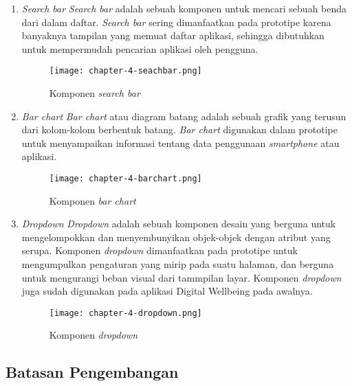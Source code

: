 \begin{enumerate}
  \item \textit{Search bar}
  \subitem \textit{Search bar} adalah sebuah komponen untuk mencari sebuah benda dari dalam daftar. \textit{Search bar} sering dimanfaatkan pada prototipe karena banyaknya tampilan yang memuat daftar aplikasi, sehingga dibutuhkan untuk mempermudah pencarian aplikasi oleh pengguna.
 
  \begin{figure}[h]
    \centering
    \texttt{[image: chapter-4-seachbar.png]}
    \caption{Komponen \textit{search bar}}
    \label{img:searchbar}
  \end{figure}
  \FloatBarrier

  \item \textit{Bar chart}
  \subitem \textit{Bar chart} atau diagram batang adalah sebuah grafik yang terusun dari kolom-kolom berbentuk batang. \textit{Bar chart} digunakan dalam prototipe untuk menyampaikan informasi tentang data penggunaan \textit{smartphone} atau aplikasi.
 
  \begin{figure}[h]
    \centering
    \texttt{[image: chapter-4-barchart.png]}
    \caption{Komponen \textit{bar chart}}
    \label{img:barchart}
  \end{figure}
  \FloatBarrier

  \item \textit{Dropdown}
  \subitem \textit{Dropdown} adalah sebuah komponen desain yang berguna untuk mengelompokkan dan menyembunyikan objek-objek dengan atribut yang serupa. Komponen \textit{dropdown} dimanfaatkan pada prototipe untuk mengumpulkan pengaturan yang mirip pada suatu halaman, dan berguna untuk mengurangi beban visual dari tammpilan layar. Komponen \textit{dropdown} juga sudah digunakan pada aplikasi Digital Wellbeing pada awalnya.
 
  \begin{figure}[h]
    \centering
    \texttt{[image: chapter-4-dropdown.png]}
    \caption{Komponen \textit{dropdown}}
    \label{img:dropdown}
  \end{figure}
  \FloatBarrier

\end{enumerate}


\subsection{Batasan Pengembangan}
\label{subsec:hifi_1_batasan}

